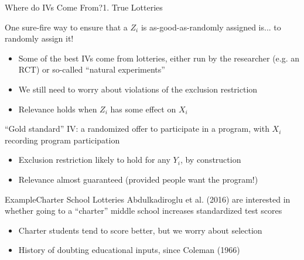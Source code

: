 \documentclass{beamer}
\begin{document}
\begin{frame}{Where do IVs Come From?}{1. True Lotteries}

One sure-fire way to ensure that a $Z_i$ is as-good-as-randomly assigned is... \pause to randomly assign it!\pause

\begin{itemize}
  \item Some of the best IVs come from lotteries, either run by the researcher (e.g. an RCT) or so-called ``natural experiments''

  \item We still need to worry about violations of the exclusion restriction

  \item Relevance holds when $Z_i$ has some effect on $X_i$
\end{itemize}\pause
\medskip

``Gold standard'' IV: a randomized offer to participate in a program, with $X_i$ recording program participation
\begin{itemize}
  \item Exclusion restriction likely to hold for any $Y_i$, by construction

  \item Relevance almost guaranteed (provided people want the program!)
\end{itemize}

\end{frame}

\begin{frame}{Example}{Charter School Lotteries}
Abdulkadiroglu et al. (2016) are interested in whether going to a ``charter'' middle school increases standardized test scores
\begin{itemize}
  \item Charter students tend to score better, but we worry about selection

  \item History of doubting educational inputs, since Coleman (1966)
\end{itemize}
\end{frame}
\end{document}
